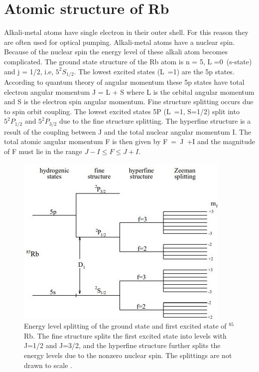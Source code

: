 \section{Atomic structure of Rb }
\label{sec:Rb structure} 
Alkali-metal atoms have single electron in their outer shell. For this reason they are often used for optical pumping. Alkali-metal atoms have a nuclear spin.
 Because of the nuclear spin the energy level of these alkali atom becomes complicated. The ground state structure of the Rb atom is n = 5, L =0~(s-state) and j = 1/2, i.e, $5^2S_{1/2}$. The lowest excited states (L~=1) are the 5p states. According to quantum theory of angular momentum these 5p states have total electron angular momentum J = L + S where L is the orbital angular momentum and S is the electron spin angular momentum. Fine structure splitting occurs due to spin orbit coupling.  The lowest excited states 5P (L~=1, S=1/2) split into  $5^2P_{1/2}$ and $5^2P_{3/2}$  due to the fine structure splitting. The hyperfine structure is a result of the coupling between J and the total nuclear angular momentum I. The total atomic angular momentum F is then given by F~=~J~+I  and the magnitude of F must lie in the range
$J - I \leq F \leq J + I$.
\begin{figure}[h]
\centering
\includegraphics[width=0.7\linewidth]{figures/Rb_structure.JPG}
\caption{ Energy level splitting of the ground state and first excited state of $^{85}$Rb.
The fine structure splits the first excited state into levels with J=1/2 and J=3/2, and the hyperfine
structure further splits the energy levels due to the nonzero nuclear spin.  The splittings are not drawn to scale \cite{bib:Seltzer_thesis}. \label{fig:Rb_structure}}
\end{figure}

